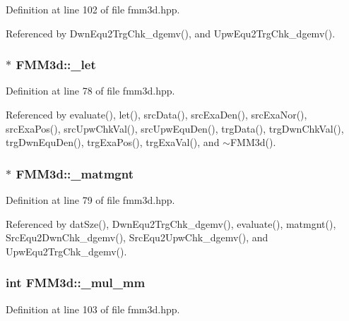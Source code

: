 Definition at line 102 of file fmm3d.hpp.

Referenced by Dwn\-Equ2Trg\-Chk\_\-dgemv(), and Upw\-Equ2Trg\-Chk\_\-dgemv().
\subsubsection{$\ast$ {\bf FMM3d::\_\-let}\hspace{0.3cm}{\tt  [protected]}}\label{classFMM3d_5ec1dc5c086621178fb0d5330b42d25f_5ec1dc5c086621178fb0d5330b42d25f}




Definition at line 78 of file fmm3d.hpp.

Referenced by evaluate(), let(), src\-Data(), src\-Exa\-Den(), src\-Exa\-Nor(), src\-Exa\-Pos(), src\-Upw\-Chk\-Val(), src\-Upw\-Equ\-Den(), trg\-Data(), trg\-Dwn\-Chk\-Val(), trg\-Dwn\-Equ\-Den(), trg\-Exa\-Pos(), trg\-Exa\-Val(), and $\sim$FMM3d().
\subsubsection{$\ast$ {\bf FMM3d::\_\-matmgnt}\hspace{0.3cm}{\tt  [protected]}}\label{classFMM3d_474e4a2b47111ab4d3c8574ec8418b21_474e4a2b47111ab4d3c8574ec8418b21}




Definition at line 79 of file fmm3d.hpp.

Referenced by dat\-Sze(), Dwn\-Equ2Trg\-Chk\_\-dgemv(), evaluate(), matmgnt(), Src\-Equ2Dwn\-Chk\_\-dgemv(), Src\-Equ2Upw\-Chk\_\-dgemv(), and Upw\-Equ2Trg\-Chk\_\-dgemv().
\subsubsection{\setlength{\rightskip}{0pt plus 5cm}int {\bf FMM3d::\_\-mul\_\-mm}\hspace{0.3cm}{\tt  [protected]}}\label{classFMM3d_e94ccbfd1835de018fd30dd32294fc9f_e94ccbfd1835de018fd30dd32294fc9f}




Definition at line 103 of file fmm3d.hpp.
